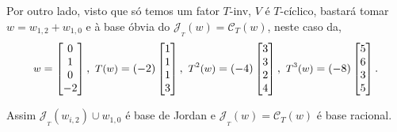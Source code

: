 {{\par\noindent Por outro lado, visto que só temos um fator \(T\)-inv, \(V\) é \(T\)-cíclico, bastará tomar \(w = w_{1,2} + w_{1,0}\) e à base óbvia do \(\mathscr{J}_{_T}(w) = \mathscr{C}_{T}(w) \), neste caso da,
{\footnotesize \[\text{\small $w$} = \begin{bmatrix} 0 \\ 1 \\ 0 \\ -2\end{bmatrix}, \ \text{\small $T(w)$}  = (-2)\begin{bmatrix} 1 \\ 1 \\ 1\\ 3\end{bmatrix}, \ \text{\small $T^2(w)$} = (-4)\begin{bmatrix} 3 \\ 3 \\ 2 \\ 4  \end{bmatrix} , \ \text{\small $T^3(w)$} = (-8)\begin{bmatrix} 5 \\ 6 \\ 3 \\ 5  \end{bmatrix}. \]}
\par\noindent Assim \(\mathscr{J}_{_T}(w_{i,2}) \cup w_{1,0}\) é base de Jordan e \(\mathscr{J}_{_T}(w) = \mathscr{C}_{T}(w)\) é base racional. 
}}


